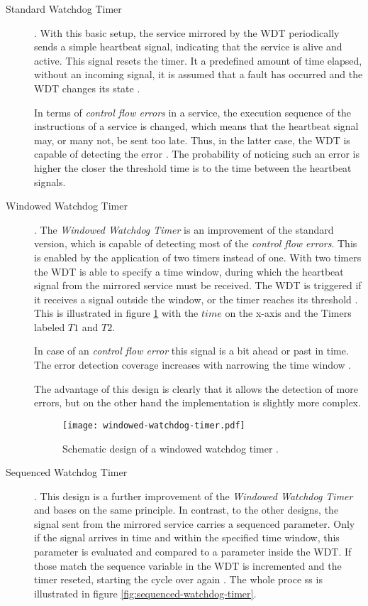 \begin{description}
\item [Standard Watchdog Timer] .
With this basic setup, the service mirrored by the WDT periodically sends a simple heartbeat signal, indicating that the service is alive and active. This signal resets the timer. It a predefined amount of time elapsed, without an incoming signal, it is assumed that a fault has occurred and the WDT changes its state \cite{elattar2007}.

In terms of \emph{control flow errors} in a service, the execution sequence of the instructions of a service is changed, which means that the heartbeat signal may, or many not, be sent too late. Thus, in the latter case, the WDT is capable of detecting the error \cite{elattar2007}. 
The probability of noticing such an error is higher the closer the threshold time is to the time between the heartbeat signals.

\item [Windowed Watchdog Timer] .
The \emph{Windowed Watchdog Timer} is an improvement of the standard version, which is capable of detecting most of the \emph{control flow errors}. This is enabled by the application of two timers instead of one. With two timers the WDT is able to specify a time window, during which the heartbeat signal from the mirrored service must be received. The WDT is triggered if it receives a signal outside the window, or the timer reaches its threshold \cite{elattar2007}. This is illustrated in figure \ref{fig:windowed-watchdog-timer} with the $time$ on the x-axis and the Timers labeled $T1$ and $T2$.

In case of an \emph{control flow error} this signal is a bit ahead or past in time. The error detection coverage increases with narrowing the time window \cite{elattar2007}.  

The advantage of this design is clearly that it allows the detection of more errors, but on the other hand the implementation is slightly more complex.

\begin{figure}[ht]
\centering
\caption{Schematic design of a windowed watchdog timer \cite{elattar2007}.}
\label{fig:windowed-watchdog-timer}
\texttt{[image: windowed-watchdog-timer.pdf]}
\end{figure}

\item [Sequenced Watchdog Timer] . 
This design is a further improvement of the \emph{Windowed Watchdog Timer} and bases on the same principle. In contrast, to the other designs, the signal sent from the mirrored service carries a sequenced parameter. Only if the signal arrives in time and within the specified time window, this parameter is evaluated and compared to a parameter inside the WDT. If those match the sequence variable in the WDT is incremented and the timer reseted, starting the cycle over again \cite{elattar2007}.
The whole proce ss is illustrated in figure \ref{fig:sequenced-watchdog-timer}.


\end{description}
